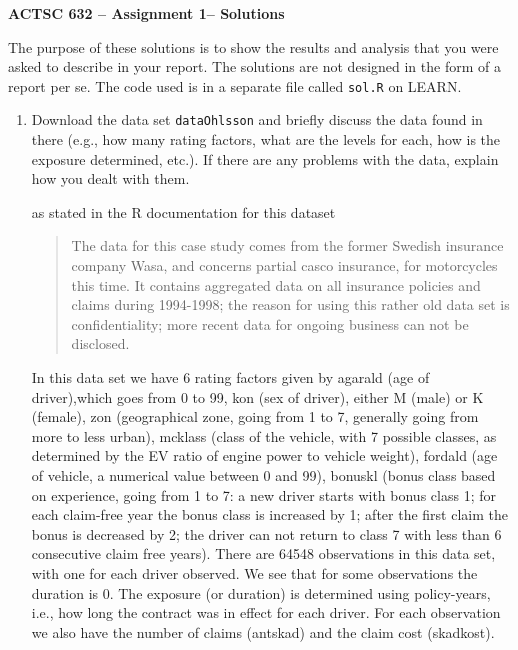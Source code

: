 \documentclass[11pt]{article}
\begin{document}
\begin{center}
{\large \bf ACTSC 632 -- Assignment 1-- Solutions} \\

\end{center}

The purpose of these solutions is to show the results and analysis that you were asked to describe in your report. The solutions are not designed in the form of a report per se. The code used is in a separate file called {\tt sol.R} on LEARN.



\begin{enumerate}
  
\item Download the data set {\tt dataOhlsson} and briefly discuss the data found in there (e.g., how many rating factors, what are the levels for each, how is the exposure determined, etc.). If there are any problems with the data, explain how you dealt with them. 

 as stated in the R documentation for this dataset

\begin{quote}
The data for this case study comes from the former Swedish insurance company Wasa, and concerns partial casco insurance, for motorcycles this time. It contains aggregated data on all insurance policies and claims during 1994-1998; the reason for using this rather old data set is confidentiality; more recent data for ongoing business can not be disclosed.
\end{quote}

In this data set we have 6 rating factors given by agarald (age of driver),which goes from 0 to 99, kon (sex of driver), either M (male) or K (female), zon (geographical zone, going from 1 to 7, generally going from more to less urban), mcklass (class of the vehicle, with 7 possible classes, as determined by the EV ratio of engine power to vehicle weight), fordald (age of vehicle, a numerical value between 0 and 99), bonuskl (bonus class based on experience, going from 1 to 7: a new driver starts with bonus class 1; for each claim-free year the bonus class is increased by 1; after the first claim the bonus is decreased by 2; the driver can not return to class 7 with less than 6 consecutive claim free years). There are 64548 observations in this data set, with one for each driver observed. We see that for some observations the duration is 0. The exposure (or duration) is determined using policy-years, i.e., how long the contract was in effect for each driver.
For each observation we also have the number of claims (antskad) and the claim cost (skadkost).



\end{enumerate}
\end{document}
